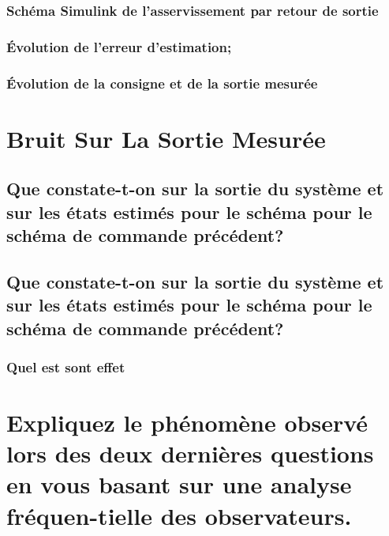   \subsubsection{Schéma Simulink de l’asservissement par retour de sortie}
  \subsubsection{Évolution de l’erreur d’estimation;}
  \subsubsection{Évolution de la consigne et de la sortie mesurée}
  
 \section{Bruit Sur La Sortie Mesurée}

  \subsection{Que constate-t-on sur la sortie du système et sur les états estimés pour le schéma pour le schéma de commande précédent?}
  \subsection{Que constate-t-on sur la sortie du système et sur les états estimés pour le schéma pour le schéma de commande précédent?}
   \subsubsection{Quel est sont effet } 
  
  \section{Expliquez le phénomène observé lors des deux dernières questions en vous basant sur une analyse fréquen-tielle des observateurs.} 